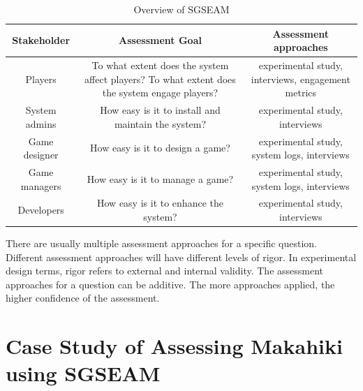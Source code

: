 \documentclass{sigchi}
\newcommand\tabhead[1]{\small\textbf{#1}}
\begin{document}
\begin{table}
  \centering
  \begin{tabular}{|c|c|c|}
    \hline
    \multicolumn{1}{|p{0.2\columnwidth}|}{\centering\tabhead{Stakeholder}} &
    \multicolumn{1}{|p{0.35\columnwidth}|}{\centering\tabhead{Assessment Goal}} &
    \multicolumn{1}{|p{0.35\columnwidth}|}{\centering\tabhead{Assessment approaches}} \\
    \hline
    \multicolumn{1}{|p{0.2\columnwidth}|}{Players} &
    \multicolumn{1}{|p{0.35\columnwidth}|}{To what extent does the system affect players?
        To what extent does the system engage players?} &
    \multicolumn{1}{|p{0.35\columnwidth}|}{experimental study, interviews,
                engagement metrics} \\
    \hline
    \multicolumn{1}{|p{0.2\columnwidth}|}{System admins} &
    \multicolumn{1}{|p{0.35\columnwidth}|}{How easy is it to install and maintain the system?} &
    \multicolumn{1}{|p{0.35\columnwidth}|}{experimental study, interviews} \\
    \hline
    \multicolumn{1}{|p{0.2\columnwidth}|}{Game designer} &
    \multicolumn{1}{|p{0.35\columnwidth}|}{How easy is it to design a game?} &
    \multicolumn{1}{|p{0.35\columnwidth}|}{experimental study, system logs, interviews } \\
    \hline
    \multicolumn{1}{|p{0.2\columnwidth}|}{Game managers} &
    \multicolumn{1}{|p{0.35\columnwidth}|}{How easy is it to manage a game?} &
    \multicolumn{1}{|p{0.35\columnwidth}|}{experimental study, system logs, interviews} \\
    \hline
    \multicolumn{1}{|p{0.2\columnwidth}|}{Developers} &
    \multicolumn{1}{|p{0.35\columnwidth}|}{How easy is it to enhance the system?} &
    \multicolumn{1}{|p{0.35\columnwidth}|}{experimental study, interviews} \\
    \hline
  \end{tabular}
  \caption{Overview of SGSEAM}
  \label{fig:overview}
\end{table}

There are usually multiple assessment approaches for a specific question. Different assessment
approaches will have different levels of rigor. In experimental design terms, rigor refers to
external and internal validity. The assessment approaches for a question
can be additive. The more approaches applied, the higher confidence of the assessment.

\section{Case Study of Assessing Makahiki using SGSEAM}
\end{document}
